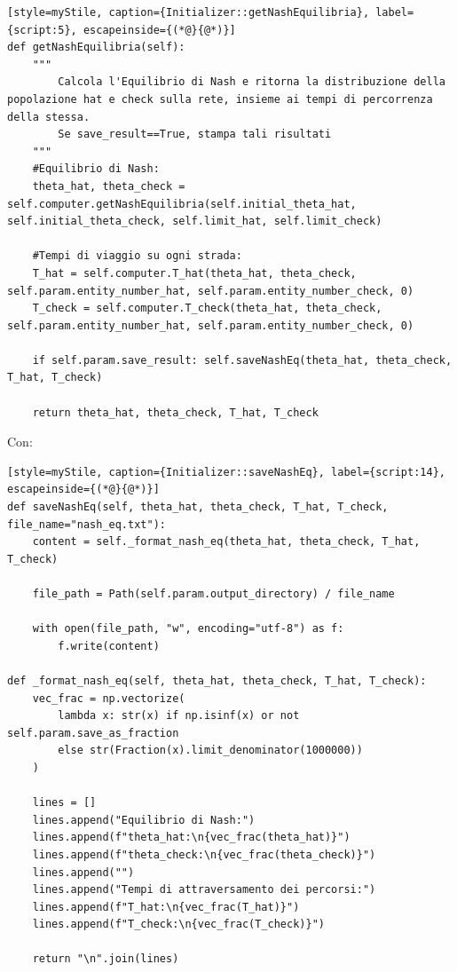 \begin{lstlisting}[style=myStile, caption={Initializer::getNashEquilibria}, label={script:5}, escapeinside={(*@}{@*)}]
def getNashEquilibria(self):
    """
        Calcola l'Equilibrio di Nash e ritorna la distribuzione della popolazione hat e check sulla rete, insieme ai tempi di percorrenza della stessa.
        Se save_result==True, stampa tali risultati
    """     
    #Equilibrio di Nash:
    theta_hat, theta_check = self.computer.getNashEquilibria(self.initial_theta_hat, self.initial_theta_check, self.limit_hat, self.limit_check)
    
    #Tempi di viaggio su ogni strada:
    T_hat = self.computer.T_hat(theta_hat, theta_check, self.param.entity_number_hat, self.param.entity_number_check, 0)
    T_check = self.computer.T_check(theta_hat, theta_check, self.param.entity_number_hat, self.param.entity_number_check, 0)
    
    if self.param.save_result: self.saveNashEq(theta_hat, theta_check, T_hat, T_check)
    
    return theta_hat, theta_check, T_hat, T_check
\end{lstlisting}

Con: 

\begin{lstlisting}[style=myStile, caption={Initializer::saveNashEq}, label={script:14}, escapeinside={(*@}{@*)}]
def saveNashEq(self, theta_hat, theta_check, T_hat, T_check, file_name="nash_eq.txt"):
    content = self._format_nash_eq(theta_hat, theta_check, T_hat, T_check)

    file_path = Path(self.param.output_directory) / file_name

    with open(file_path, "w", encoding="utf-8") as f:
        f.write(content)

def _format_nash_eq(self, theta_hat, theta_check, T_hat, T_check):
    vec_frac = np.vectorize(
        lambda x: str(x) if np.isinf(x) or not self.param.save_as_fraction 
        else str(Fraction(x).limit_denominator(1000000))
    )

    lines = []
    lines.append("Equilibrio di Nash:")
    lines.append(f"theta_hat:\n{vec_frac(theta_hat)}")
    lines.append(f"theta_check:\n{vec_frac(theta_check)}")
    lines.append("")
    lines.append("Tempi di attraversamento dei percorsi:")
    lines.append(f"T_hat:\n{vec_frac(T_hat)}")
    lines.append(f"T_check:\n{vec_frac(T_check)}")

    return "\n".join(lines)
\end{lstlisting}

